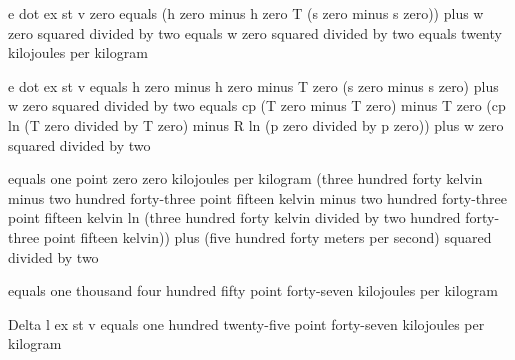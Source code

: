 e dot ex st v zero equals (h zero minus h zero T (s zero minus s zero)) plus w zero squared divided by two equals w zero squared divided by two equals twenty kilojoules per kilogram

e dot ex st v equals h zero minus h zero minus T zero (s zero minus s zero) plus w zero squared divided by two equals cp (T zero minus T zero) minus T zero (cp ln (T zero divided by T zero) minus R ln (p zero divided by p zero)) plus w zero squared divided by two

equals one point zero zero kilojoules per kilogram (three hundred forty kelvin minus two hundred forty-three point fifteen kelvin minus two hundred forty-three point fifteen kelvin ln (three hundred forty kelvin divided by two hundred forty-three point fifteen kelvin)) plus (five hundred forty meters per second) squared divided by two

equals one thousand four hundred fifty point forty-seven kilojoules per kilogram

Delta l ex st v equals one hundred twenty-five point forty-seven kilojoules per kilogram